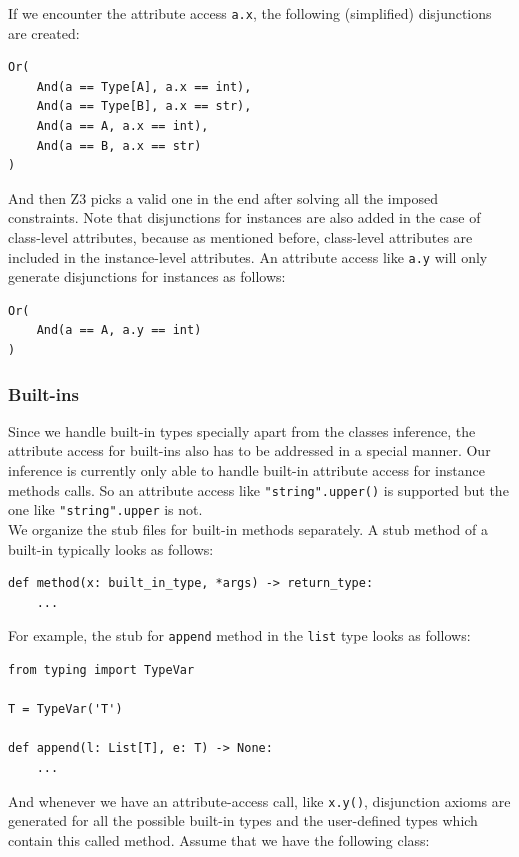 If we encounter the attribute access \lstinline|a.x|, the following (simplified) disjunctions are created:
\begin{lstlisting}
Or(
	And(a == Type[A], a.x == int),
	And(a == Type[B], a.x == str),
	And(a == A, a.x == int),
	And(a == B, a.x == str)
)
\end{lstlisting}

And then Z3 picks a valid one in the end after solving all the imposed constraints. Note that disjunctions for instances are also added in the case of class-level attributes, because as mentioned before, class-level attributes are included in the instance-level attributes. An attribute access like \lstinline|a.y| will only generate disjunctions for instances as follows:
\begin{lstlisting}
Or(
	And(a == A, a.y == int)
)
\end{lstlisting}
\subsubsection{Built-ins}
Since we handle built-in types specially apart from the classes inference, the attribute access for built-ins also has to be addressed in a special manner. Our inference is currently only able to handle built-in attribute access for instance methods calls. So an attribute access like \lstinline|"string".upper()| is supported but the one like \lstinline|"string".upper| is not. \\

We organize the stub files for built-in methods separately. A stub method of a built-in typically looks as follows:

\begin{lstlisting}
def method(x: built_in_type, *args) -> return_type:
	...
\end{lstlisting}

For example, the stub for \lstinline|append| method in the \lstinline|list| type looks as follows:

\begin{lstlisting}
from typing import TypeVar

T = TypeVar('T')

def append(l: List[T], e: T) -> None:
	...
\end{lstlisting}

And whenever we have an attribute-access call, like \lstinline|x.y()|, disjunction axioms are generated for all the possible built-in types and the user-defined types which contain this called method. Assume that we have the following class:

